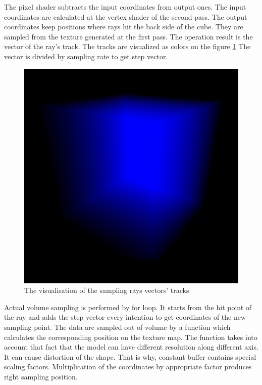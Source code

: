 \documentclass[twoside, english, 11pt]{report}
\begin{document}
The pixel shader subtracts the input coordinates from output ones. The input coordinates are calculated at the vertex shader of the second pass. The output coordinates keep positions where rays hit the back side of the cube. They are sampled from the texture generated at the first pass. The operation result is the vector of the ray's track. The tracks are visualized as colors on the figure \ref{fig:final} The vector is divided by sampling rate to get step vector.
\begin{figure}[!h]
\centerline{\includegraphics[scale = 0.3]{img/final}}
\caption{The visualisation of the sampling rays vectors' tracks \label{fig:final}}
\end{figure}
Actual volume sampling is performed by for loop. It starts from the hit point of the ray and adds the step vector every intention to get coordinates of the new sampling point. The data are sampled out of volume by a function which calculates the corresponding position on the texture map. The function takes into account that fact that the model can have different resolution along different axis. It can cause distortion of the shape. That is why, constant buffer contains special scaling factors. Multiplication of the coordinates by appropriate factor produces right sampling position.\\
\end{document}
